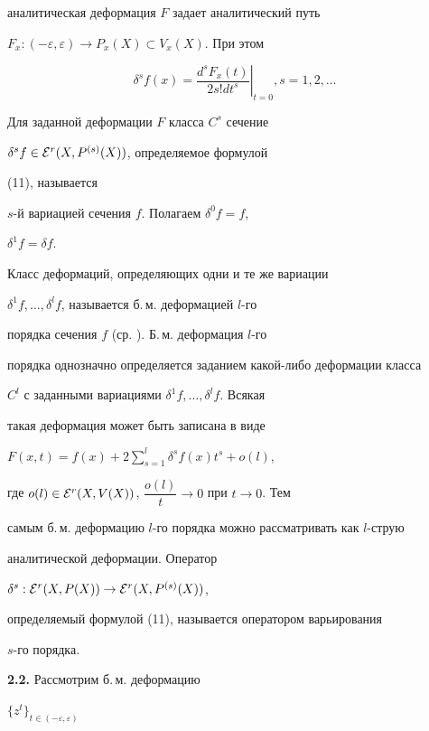 аналитическая деформация $F$ задает аналитический путь


$F_x: (-\varepsilon,\varepsilon)\to P_x(X)\subset V_x(X)$. При этом


\begin{equation}


\left.\delta^sf(x)=\frac{d^sF_x(t)}{2s!dt^s}\right|_{t=0}, 


s=1,2,\dotsc


\end{equation}


Для заданной деформации $F$ класса $C^s$ сечение


$\delta^sf\in {\cal E}^r(X,P^{(s)}(X))$, определяемое формулой


(11), называется


$s$-й вариацией сечения $f$. Полагаем $\delta^0f= f$,


$\delta^1f= \delta f$.





Класс деформаций, определяющих одни и те же вариации


$\delta^1f,\dotsc,\delta^lf$, называется б.\,м. деформацией $l$-го


порядка сечения $f$ (ср. \cite{Mark5}). Б.\,м. деформация $l$-го


порядка однозначно определяется заданием какой-либо деформации класса


$C^l$ с заданными вариациями $\delta^1f,\dotsc,\delta^lf$. Всякая


такая деформация может быть записана в виде


$F(x,t)=f(x)+2\sum\limits_{s=1}^{l}\delta^sf(x)t^s+o(l)$,


где $o(l)\in{\cal E}^r(X,V(X))$, $\dfrac{o(l)}{t}\to 0$ при $t\to 0$. Тем


самым б.\,м. деформацию $l$-го порядка можно рассматривать как $l$-струю


\cite{Kli} аналитической деформации. Оператор


$\delta^s: {\cal E}^r(X,P(X))\to {\cal E}^r(X,P^{(s)}(X))$,


определяемый формулой (11), называется оператором варьирования


$s$-го порядка.


\medskip





{\bf 2.2.} Рассмотрим б.\,м. деформацию


$\{z^t\}_{t\in(-\varepsilon,\varepsilon)}$


